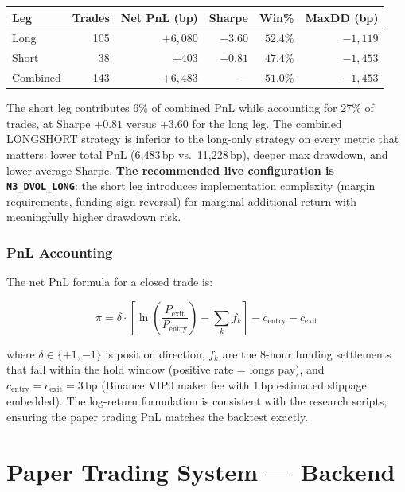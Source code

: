 \documentclass[11pt,a4paper]{article}
\newcommand{\code}[1]{\texttt{#1}}
\begin{document}
\begin{center}
\begin{tabular}{@{}lrrrrr@{}}
\toprule
\textbf{Leg} & \textbf{Trades} & \textbf{Net PnL (bp)} & \textbf{Sharpe} & \textbf{Win\%} & \textbf{MaxDD (bp)} \\
\midrule
Long & 105 & $+6{,}080$ & $+3.60$ & $52.4\%$ & $-1{,}119$ \\
Short & 38 & $+403$ & $+0.81$ & $47.4\%$ & $-1{,}453$ \\
\midrule
Combined & 143 & $+6{,}483$ & --- & $51.0\%$ & $-1{,}453$ \\
\bottomrule
\end{tabular}
\end{center}

The short leg contributes 6\% of combined PnL while accounting for 27\% of trades, at Sharpe $+0.81$ versus $+3.60$ for the long leg. The combined LONGSHORT strategy is inferior to the long-only strategy on every metric that matters: lower total PnL (6,483\,bp vs.\ 11,228\,bp), deeper max drawdown, and lower average Sharpe. \textbf{The recommended live configuration is \code{N3\_DVOL\_LONG}}: the short leg introduces implementation complexity (margin requirements, funding sign reversal) for marginal additional return with meaningfully higher drawdown risk.

\subsubsection*{PnL Accounting}

The net PnL formula for a closed trade is:

\begin{equation}
\pi = \delta \cdot \left[\ln\!\left(\frac{P_{\mathrm{exit}}}{P_{\mathrm{entry}}}\right) - \sum_{k} f_k\right] - c_{\mathrm{entry}} - c_{\mathrm{exit}}
\end{equation}

where $\delta \in \{+1, -1\}$ is position direction, $f_k$ are the 8-hour funding settlements that fall within the hold window (positive rate = longs pay), and $c_{\mathrm{entry}} = c_{\mathrm{exit}} = 3\,\text{bp}$ (Binance VIP0 maker fee with 1\,bp estimated slippage embedded). The log-return formulation is consistent with the research scripts, ensuring the paper trading PnL matches the backtest exactly.

\section{Paper Trading System --- Backend}
\end{document}
